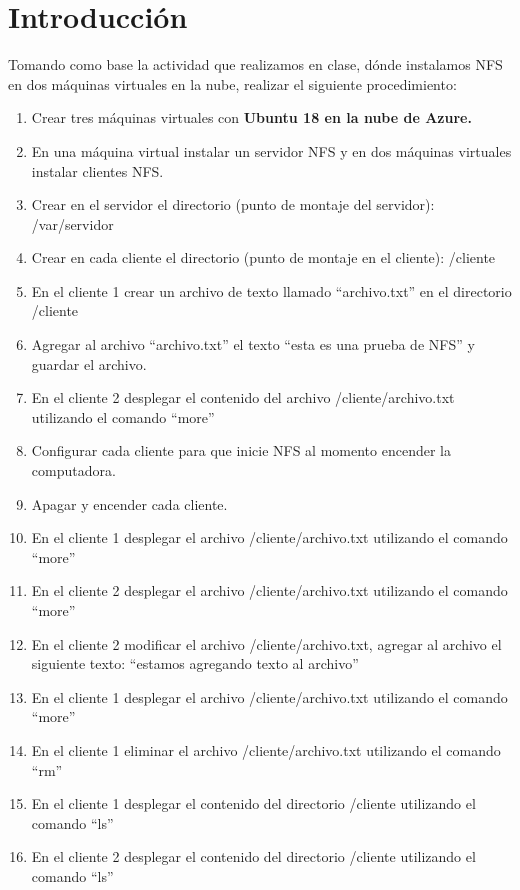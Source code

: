\documentclass[11pt]{article}
\begin{document}
	\section{Introducción}
	Tomando como base la actividad que realizamos en clase, dónde instalamos NFS en dos máquinas virtuales en la nube, realizar el siguiente procedimiento:
		\begin{enumerate}
			\item Crear tres máquinas virtuales con \textbf{Ubuntu 18 en la nube de Azure.}
			\item En una máquina virtual instalar un servidor NFS y en dos máquinas virtuales instalar clientes NFS.
			\item Crear en el servidor el directorio (punto de montaje del servidor): /var/servidor
			\item Crear en cada cliente el directorio (punto de montaje en el cliente): /cliente
			\item En el cliente 1 crear un archivo de texto llamado ``archivo.txt'' en el directorio /cliente
			\item Agregar al archivo ``archivo.txt'' el texto ``esta es una prueba de NFS'' y guardar el archivo.
			\item En el cliente 2 desplegar el contenido del archivo /cliente/archivo.txt utilizando el comando ``more''
			\item Configurar cada cliente para que inicie NFS al momento encender la computadora.
			\item Apagar y encender cada cliente.
			\item En el cliente 1 desplegar el archivo /cliente/archivo.txt utilizando el comando ``more''
			\item En el cliente 2 desplegar el archivo /cliente/archivo.txt utilizando el comando ``more''
			\item En el cliente 2 modificar el archivo /cliente/archivo.txt, agregar al archivo el siguiente texto: ``estamos agregando texto al archivo''
			\item En el cliente 1 desplegar el archivo /cliente/archivo.txt utilizando el comando ``more''
			\item En el cliente 1 eliminar el archivo /cliente/archivo.txt utilizando el comando ``rm''
			\item En el cliente 1 desplegar el contenido del directorio /cliente utilizando el comando ``ls''
			\item En el cliente 2 desplegar el contenido del directorio /cliente utilizando el comando ``ls''
		\end{enumerate}
		
\end{document}
